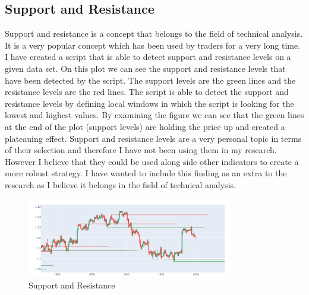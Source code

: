 \documentclass{imc-inf}
\begin{document}
	
	\begin{appendices} %
		\chapter{Support and Resistance}\label{appendix:support_resistance}
			Support and resistance is a concept that belongs to the field of technical analysis. It is a very popular concept which has been used by traders for a very long time. I have created a script that is able to detect support and resistance levels on a given data set.
			On this plot we can see the support and resistance levels that have been detected by the script. The support levels are the green lines and the resistance levels are the red lines. The script is able to detect the support and resistance levels by defining
			local windows in which the script is looking for the lowest and highest values. By examining the figure we can see that the green lines at the end  of the plot (support levels) are holding the price up and created a plateauing effect.
			Support and resistance levels are a very personal topic in terms of their selection and therefore I have not been using them in my research. However I believe that they could be used along side other indicators to create a more robust strategy.
			I have wanted to include this finding as an extra to the research as I believe it belongs in the field of technical analysis.
			\begin{figure}[h!]
				\centering
				\includegraphics[width=0.8\textwidth]{support_resistance.png}
				\caption{Support and Resistance}
				\label{fig:support_resistance}
			\end{figure}

	\end{appendices}
	
\end{document}
